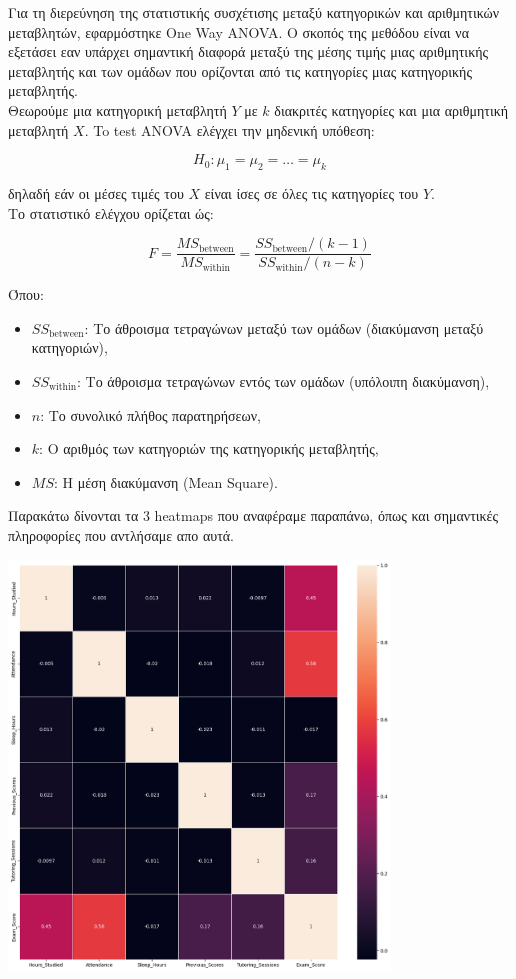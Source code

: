\documentclass[12pt]{article}
\begin{document}
\noindent Για τη διερεύνηση της στατιστικής συσχέτισης μεταξύ κατηγορικών και αριθμητικών μεταβλητών, εφαρμόστηκε One Way ANOVA. Ο σκοπός της μεθόδου είναι να εξετάσει εαν υπάρχει σημαντική διαφορά μεταξύ της μέσης τιμής μιας αριθμητικής μεταβλητής και των ομάδων που ορίζονται από τις κατηγορίες μιας κατηγορικής μεταβλητής.\\

\noindent Θεωρούμε μια κατηγορική μεταβλητή \( Y \) με \( k \) διακριτές κατηγορίες και μια αριθμητική μεταβλητή \( X \). To test ANOVA ελέγχει την μηδενική υπόθεση:

\[
H_0: \mu_1 = \mu_2 = \dots = \mu_k
\]

\noindent δηλαδή εάν οι μέσες τιμές του \( X \) είναι ίσες σε όλες τις κατηγορίες του \( Y \).\\

\noindent Το στατιστικό ελέγχου ορίζεται ώς: 

\[
F = \frac{MS_{\text{between}}}{MS_{\text{within}}}
= \frac{SS_{\text{between}} / (k - 1)}{SS_{\text{within}} / (n - k)}
\]

\noindent Όπου:
\begin{itemize}
    \item \( SS_{\text{between}} \): Το άθροισμα τετραγώνων μεταξύ των ομάδων (διακύμανση μεταξύ κατηγοριών),
    \item \( SS_{\text{within}} \): Το άθροισμα τετραγώνων εντός των ομάδων (υπόλοιπη διακύμανση),
    \item \( n \): Το συνολικό πλήθος παρατηρήσεων,
    \item \( k \): Ο αριθμός των κατηγοριών της κατηγορικής μεταβλητής,
    \item \( MS \): Η μέση διακύμανση (Mean Square).
\end{itemize}


\noindent Παρακάτω δίνονται τα 3 heatmaps που αναφέραμε παραπάνω, όπως και σημαντικές πληροφορίες που αντλήσαμε απο αυτά.

\begin{center}
    \includegraphics[width=0.76\textwidth]{./images/arithmetic_relation.png}
    
\end{center}
\end{document}
